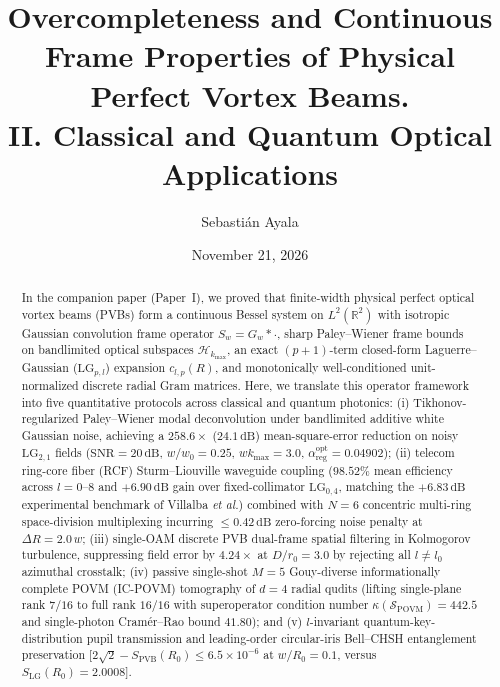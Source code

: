 \documentclass[aps,pra,reprint,nofootinbib,floatfix,longbibliography]{revtex4-2}
\begin{document}
\title{Overcompleteness and Continuous Frame Properties of Physical Perfect Vortex Beams.\\II. Classical and Quantum Optical Applications}

\author{Sebasti\'an Ayala}

\date{November 21, 2026}

\begin{abstract}
In the companion paper (Paper~I), we proved that finite-width physical perfect optical vortex beams (PVBs) form a continuous Bessel system on $L^2(\mathbb{R}^2)$ with isotropic Gaussian convolution frame operator $S_w = G_w * \cdot$, sharp Paley--Wiener frame bounds on bandlimited optical subspaces $\mathcal{H}_{k_{\max}}$, an exact $(p+1)$-term closed-form Laguerre--Gaussian ($\mathrm{LG}_{p,l}$) expansion $c_{l,p}(R)$, and monotonically well-conditioned unit-normalized discrete radial Gram matrices. Here, we translate this operator framework into five quantitative protocols across classical and quantum photonics: (i) Tikhonov-regularized Paley--Wiener modal deconvolution under bandlimited additive white Gaussian noise, achieving a $258.6\times$ ($24.1\,\mathrm{dB}$) mean-square-error reduction on noisy $\mathrm{LG}_{2,1}$ fields ($\mathrm{SNR} = 20\,\mathrm{dB}$, $w/w_0 = 0.25$, $w k_{\max} = 3.0$, $\alpha_{\mathrm{reg}}^{\mathrm{opt}} = 0.04902$); (ii) telecom ring-core fiber (RCF) Sturm--Liouville waveguide coupling ($98.52\%$ mean efficiency across $l = 0\text{--}8$ and $+6.90\,\mathrm{dB}$ gain over fixed-collimator $\mathrm{LG}_{0,4}$, matching the $+6.83\,\mathrm{dB}$ experimental benchmark of Villalba \emph{et al.}) combined with $N = 6$ concentric multi-ring space-division multiplexing incurring $\le 0.42\,\mathrm{dB}$ zero-forcing noise penalty at $\Delta R = 2.0\,w$; (iii) single-OAM discrete PVB dual-frame spatial filtering in Kolmogorov turbulence, suppressing field error by $4.24\times$ at $D/r_0 = 3.0$ by rejecting all $l \neq l_0$ azimuthal crosstalk; (iv) passive single-shot $M = 5$ Gouy-diverse informationally complete POVM (IC-POVM) tomography of $d = 4$ radial qudits (lifting single-plane rank $7/16$ to full rank $16/16$ with superoperator condition number $\kappa(\mathcal{S}_{\mathrm{POVM}}) = 442.5$ and single-photon Cram\'er--Rao bound $41.80$); and (v) $l$-invariant quantum-key-distribution pupil transmission and leading-order circular-iris Bell--CHSH entanglement preservation [$2\sqrt{2} - S_{\mathrm{PVB}}(R_0) \le 6.5\times 10^{-6}$ at $w/R_0 = 0.1$, versus $S_{\mathrm{LG}}(R_0) = 2.0008$].
\end{abstract}
\end{document}
